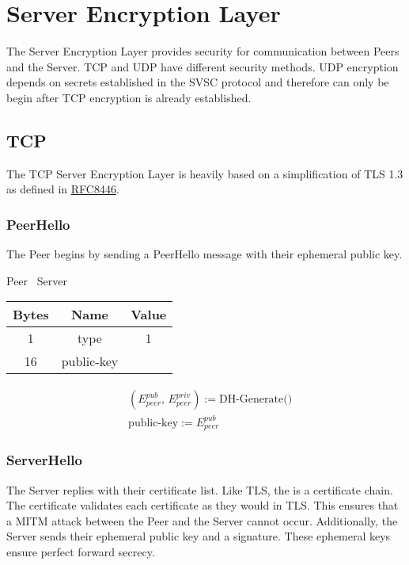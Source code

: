 \section{Server Encryption Layer}

The Server Encryption Layer provides security for communication between Peers and the Server. TCP and UDP have
different security methods. UDP encryption depends on secrets established in the SVSC protocol and therefore can only
be begin after TCP encryption is already established.

\subsection{TCP}

The TCP Server Encryption Layer is heavily based on a simplification of TLS 1.3 as defined in
\href{https://datatracker.ietf.org/doc/html/rfc8446}{RFC8446}.

\subsubsection{PeerHello}

The Peer begins by sending a PeerHello message with their ephemeral public key.

\begin{center}
    Peer \textrightarrow\ Server\\
    \begin{tabular}{|c|c|c|}
        \hline
        \textbf{Bytes} & \textbf{Name} & \textbf{Value} \\
        \hline
        1              & type          & 1              \\
        \hline
        16             & public-key    &                \\
        \hline
    \end{tabular}
\end{center}

\begin{align*}
    &(E_{peer}^{pub},\,E_{peer}^{priv}) := \text{DH-Generate()}\\
    &\text{public-key} := E_{peer}^{pub}
\end{align*}

\subsubsection{ServerHello}

The Server replies with their certificate list. Like TLS, the is a certificate chain. The certificate validates each
certificate as they would in TLS. This ensures that a MITM attack between the Peer and the Server cannot occur.
Additionally, the Server sends their ephemeral public key and a signature. These ephemeral keys ensure perfect
forward secrecy.

